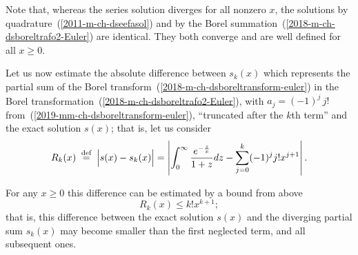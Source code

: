 Note that, whereas the series solution diverges for all nonzero $x$,
the solutions by quadrature~(\ref{2011-m-ch-dseefasol}) and by the Borel summation~(\ref{2018-m-ch-dsboreltrafo2-Euler})
are identical. They both converge and are well defined for all $x\ge 0$.

Let us now estimate the absolute difference between $s_{k}(x)$
which represents the partial sum of the Borel transform~(\ref{2018-m-ch-dsboreltransform-euler})
in the Borel transformation~(\ref{2018-m-ch-dsboreltrafo2-Euler}),
with $a_j =  (-1)^j \, j!$
from~(\ref{2019-mm-ch-dsboreltransform-euler}),
 ``truncated after the $k$th term'' and the exact solution $s(x)$; that is, let us consider
\begin{equation}
\begin{split}
  R_k(x)
\stackrel{{\tiny \textrm{ def }}}{=}
\Big\vert s(x) - s_{k}(x) \Big\vert=
\left\vert \int_0^\infty
\frac{e^{-\frac{ z }{x}}}{1+ z } d z
-
\sum_{j=0}^k (-1)^j j! x^{j+1} \right\vert .
\end{split}
\label{2011-m-ch-dseeanest}
\end{equation}

For any $x\ge 0$ this difference can be estimated\cite{rousseau-2004} by  a bound from above
\begin{equation}
  R_k(x)
\le
k! x^{k+1};
\label{2011-m-ch-dseeest}
\end{equation}
that is, this difference between the exact solution $s(x)$ and the diverging partial sum
$s_{k}(x)$ may become smaller than the first neglected term, and all subsequent ones.




